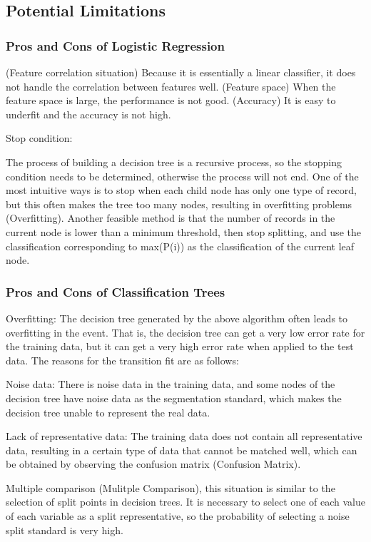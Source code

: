 \documentclass[11pt]{report}
\begin{document}
\subsection{Potential Limitations}

\subsubsection{Pros and Cons of Logistic Regression}
(Feature correlation situation) Because it is essentially a linear classifier, it does not handle the correlation between features well.
(Feature space) When the feature space is large, the performance is not good.
(Accuracy) It is easy to underfit and the accuracy is not high.

Stop condition:

The process of building a decision tree is a recursive process, so the stopping condition needs to be determined, otherwise the process will not end. One of the most intuitive ways is to stop when each child node has only one type of record, but this often makes the tree too many nodes, resulting in overfitting problems (Overfitting). Another feasible method is that the number of records in the current node is lower than a minimum threshold, then stop splitting, and use the classification corresponding to max(P(i)) as the classification of the current leaf node.
\subsubsection{Pros and Cons of Classification Trees}
Overfitting: The decision tree generated by the above algorithm often leads to overfitting in the event. That is, the decision tree can get a very low error rate for the training data, but it can get a very high error rate when applied to the test data. The reasons for the transition fit are as follows:

Noise data: There is noise data in the training data, and some nodes of the decision tree have noise data as the segmentation standard, which makes the decision tree unable to represent the real data.

Lack of representative data: The training data does not contain all representative data, resulting in a certain type of data that cannot be matched well, which can be obtained by observing the confusion matrix (Confusion Matrix).

Multiple comparison (Mulitple Comparison), this situation is similar to the selection of split points in decision trees. It is necessary to select one of each value of each variable as a split representative, so the probability of selecting a noise split standard is very high.
\end{document}

